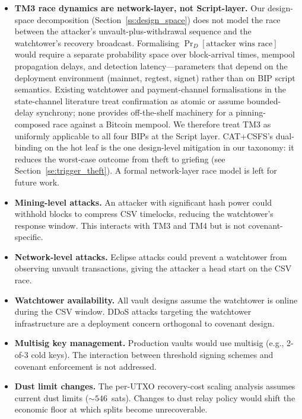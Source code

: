 \begin{itemize}
\item \textbf{TM3 race dynamics are network-layer, not Script-layer.}
  Our design-space decomposition
  (Section~\ref{ss:design_space}) does not model the race between
  the attacker's unvault-plus-withdrawal sequence and the
  watchtower's recovery broadcast. Formalising
  $\Pr_D[\text{attacker wins race}]$ would require a separate
  probability space over block-arrival times, mempool propagation
  delays, and detection latency---parameters that depend on the
  deployment environment (mainnet, regtest, signet) rather than on
  BIP script semantics. Existing watchtower and payment-channel
  formalisations in the state-channel literature treat confirmation
  as atomic or assume bounded-delay synchrony; none provides
  off-the-shelf machinery for a pinning-composed race against
  a Bitcoin mempool. We therefore treat TM3 as uniformly
  applicable to all four BIPs at the Script layer. CAT+CSFS's
  dual-binding on the hot leaf is the one design-level mitigation
  in our taxonomy: it reduces the worst-case outcome from theft to
  griefing (see Section~\ref{se:trigger_theft}). A formal network-layer
  race model is left for future work.

\item \textbf{Mining-level attacks.} An attacker with significant hash power could
  withhold blocks to compress CSV timelocks, reducing the watchtower's response
  window. This interacts with TM3 and TM4 but is not covenant-specific.

\item \textbf{Network-level attacks.} Eclipse attacks could prevent a watchtower from
  observing unvault transactions, giving the attacker a head start on the CSV race.

\item \textbf{Watchtower availability.} All vault designs assume the watchtower is
  online during the CSV window. DDoS attacks targeting the watchtower infrastructure
  are a deployment concern orthogonal to covenant design.

\item \textbf{Multisig key management.} Production vaults would use multisig (e.g.,
  2-of-3 cold keys). The interaction between threshold signing schemes and covenant
  enforcement is not addressed.

\item \textbf{Dust limit changes.} The per-UTXO recovery-cost scaling analysis assumes current
  dust limits (${\sim}546$~sats). Changes to dust relay policy would shift the
  economic floor at which splits become unrecoverable.
\end{itemize}

